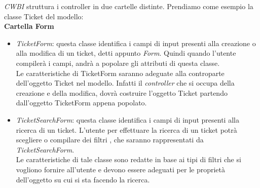 \noindent
\textit{CWBI} struttura i controller in due cartelle distinte. Prendiamo come esempio la classe Ticket del modello:\\

\textbf{Cartella Form}
\begin{itemize}
\item \textit{TicketForm}: questa classe identifica i campi di input presenti alla creazione o alla modifica di un ticket, detti appunto \textit{Form}. Quindi quando l'utente compilerà i campi, andrà a popolare gli attributi di questa classe. \\ Le caratteristiche di TicketForm saranno adeguate alla controparte dell'oggetto Ticket nel modello. Infatti il \textit{controller} che si occupa della creazione e della modifica, dovrà costruire l'oggetto Ticket partendo dall'oggetto TicketForm appena popolato. 

\item \textit{TicketSearchForm}: questa classe identifica i campi di input presenti alla ricerca di un ticket. L'utente per effettuare la ricerca di un ticket potrà scegliere o compilare dei filtri , che saranno rappresentati da \textit{TicketSearchForm}. \\
Le caratteristiche di tale classe sono redatte in base ai tipi di filtri che si vogliono fornire all'utente e devono essere adeguati per le proprietà dell'oggetto su cui si sta facendo la ricerca.

\end{itemize}
\medskip

